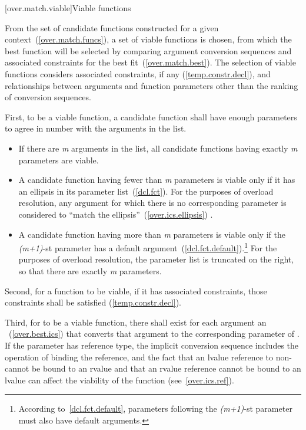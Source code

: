 [over.match.viable]{Viable functions}%

\pnum
From the set of candidate functions constructed for a given
context~(\ref{over.match.funcs}), a set of viable functions is
chosen, from which the best function will be selected by
comparing argument conversion sequences
and associated constraints
for the best fit~(\ref{over.match.best}).
The selection of viable functions considers
associated constraints, if any (\ref{temp.constr.decl}), and
relationships between arguments and function parameters other
than the ranking of conversion sequences.

\pnum
{}%
%
First, to be a viable function, a candidate function shall have
enough parameters to agree in number with the arguments in the
list.

\begin{itemize}
\item
If there are
\textit{m}
arguments in the list, all candidate
functions having exactly
\textit{m}
parameters are viable.
\item
A candidate function having fewer than
\textit{m}
parameters is
viable only if it has an ellipsis in its parameter list~(\ref{dcl.fct}).
For the purposes of overload resolution,
any argument for which there is no corresponding parameter is
considered to ``match the ellipsis''~(\ref{over.ics.ellipsis}) .
\item
A candidate function having more than
\textit{m}
parameters is viable
only if the
\textit{(m+1)}-st
parameter has a default
argument~(\ref{dcl.fct.default}).\footnote{According to~\ref{dcl.fct.default},
parameters following the
\textit{(m+1)}-st
parameter must also have default arguments.}
For the purposes of overload
resolution, the parameter list is truncated on the right, so
that there are exactly
\textit{m}
parameters.
\end{itemize}

\pnum
Second, for a function to be viable, if it has associated constraints,
those constraints shall be satisfied (\ref{temp.constr.decl}).

\pnum
Third, for
to be a viable function, there shall exist for each
argument an
~(\ref{over.best.ics}) that
converts that argument to the corresponding parameter of
.
If the parameter has reference type, the implicit conversion sequence
includes the operation of binding the reference, and the fact that
an lvalue reference to non- cannot be bound to an rvalue
and that an rvalue reference cannot be bound to an lvalue
can affect
the viability of the function (see~\ref{over.ics.ref}).

